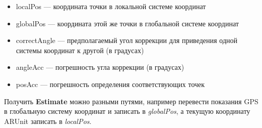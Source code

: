 \documentclass[a4paper, 11pt, titlepage]{article}
\begin{document}
        \begin{center}
        \end{center}

        \begin{itemize}
            \item localPos --- координата точки в локальной системе координат
            \item globalPos --- координата этой же точки в глобальной системе координат
            \item correctAngle --- предполагаемый угол коррекции для приведения одной системы координат к другой (в градусах) 
            \item angleAcc --- погрешность угла коррекции (в градусах)
            \item posAcc --- погрешность определения соответствующих точек
        \end{itemize}

        Получить \textbf{Estimate} можно разными путями, например перевести показания GPS в глобальную систему координат и записать в \textit{globalPos},
        а текущую координату ARUnit записать в \textit{localPos}. 

        
\end{document}
